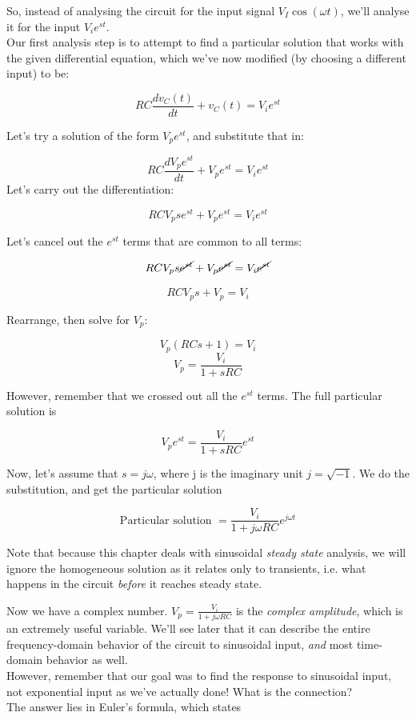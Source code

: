 \documentclass[12pt,a4paper]{report}
\begin{document}
So, instead of analysing the circuit for the input signal $V_I \cos{(\omega t)}$, we'll analyse it for the input $V_i e^{s t}$.\\
Our first analysis step is to attempt to find a particular solution that works with the given differential equation, which we've now modified (by choosing a different input) to be:

\[ RC \frac{dv_C(t)}{dt} + v_C(t) = V_i e^{s t} \]

Let's try a solution of the form $V_p e^{s t}$, and substitute that in:

\[ RC \frac{d V_p e^{s t}}{dt} + V_p e^{s t} = V_i e^{s t} \]
Let's carry out the differentiation:

\[ RC V_p s e^{s t} + V_p e^{s t} = V_i e^{s t} \]

Let's cancel out the $\displaystyle e^{s t}$ terms that are common to all terms:

\[ RC V_p s \cancel{e^{s t}} + V_p \cancel{e^{s t}} = V_i \cancel{e^{s t}} \]

\[ RC V_p s + V_p = V_i \]

Rearrange, then solve for $V_p$:

\[ V_p (RC s + 1) = V_i \]
\[ V_p = \frac{V_i}{1 + sRC} \]

However, remember that we crossed out all the $\displaystyle e^{s t}$ terms. The full particular solution is

\[ V_p e^{s t} =  \frac{V_i}{1 + sRC} e^{s t} \]

Now, let's assume that $s = j \omega$, where j is the imaginary unit $j = \sqrt{-1}$. We do the substitution, and get the particular solution

\[ \text{Particular solution } = \frac{V_i}{1 + j \omega RC} e^{j \omega t} \]

Note that because this chapter deals with sinusoidal \emph{steady state} analysis, we will ignore the homogeneous solution as it relates only to transients, i.e. what happens in the circuit \emph{before} it reaches steady state.

Now we have a complex number. $\displaystyle V_p = \frac{V_i}{1 + j \omega RC}$ is the \emph{complex amplitude}, which is an extremely useful variable. We'll see later that it can describe the entire frequency-domain behavior of the circuit to sinusoidal input, \emph{and} most time-domain behavior as well.\\

However, remember that our goal was to find the response to sinusoidal input, not exponential input as we've actually done! What is the connection?\\
The answer lies in Euler's formula, which states
\end{document}
